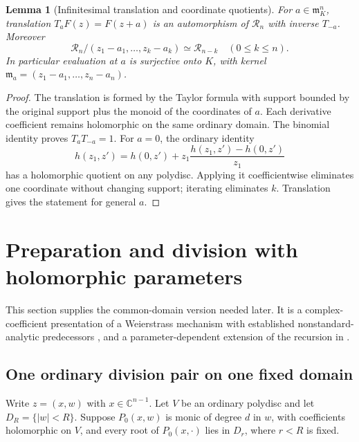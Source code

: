 \documentclass[11pt]{article}
\newtheorem{lemma}[theorem]{Lemma}
\theoremstyle{definition}
\newcommand{\C}{\mathbb C}
\newcommand{\RR}{\mathscr R}
\newcommand{\mm}{\mathfrak m}
\begin{document}
\begin{lemma}[Infinitesimal translation and coordinate quotients]\label{lem:translation}
For $a\in\mm_K^n$, translation $T_aF(z)=F(z+a)$ is an automorphism of $\RR_n$ with inverse $T_{-a}$. Moreover
\begin{equation}\label{eq:coordinatequotient}
 \RR_n/(z_1-a_1,\ldots,z_k-a_k)\simeq\RR_{n-k}
 \quad(0\le k\le n).
\end{equation}
In particular evaluation at $a$ is surjective onto $K$, with kernel
$\mm_a=(z_1-a_1,\ldots,z_n-a_n)$.
\end{lemma}
\begin{proof}
The translation is formed by the Taylor formula with support bounded by the original support plus the monoid of the coordinates of $a$. Each derivative coefficient remains holomorphic on the same ordinary domain. The binomial identity proves $T_aT_{-a}=1$. For $a=0$, the ordinary identity
\[
 h(z_1,z')=h(0,z')+z_1\frac{h(z_1,z')-h(0,z')}{z_1}
\]
has a holomorphic quotient on any polydisc. Applying it coefficientwise eliminates one coordinate without changing support; iterating eliminates $k$. Translation gives the statement for general $a$.
\end{proof}

\section{Preparation and division with holomorphic parameters}\label{sec:prep}
This section supplies the common-domain version needed later. It is a complex-coefficient presentation of a Weierstrass mechanism with established nonstandard-analytic predecessors \cite{CLR,CL}, and a parameter-dependent extension of the recursion in \cite{Source}.

\subsection{One ordinary division pair on one fixed domain}
Write $z=(x,w)$ with $x\in\C^{n-1}$. Let $V$ be an ordinary polydisc and let $D_R=\{|w|<R\}$. Suppose $P_0(x,w)$ is monic of degree $d$ in $w$, with coefficients holomorphic on $V$, and every root of $P_0(x,\cdot)$ lies in $D_r$, where $r<R$ is fixed.
\end{document}
